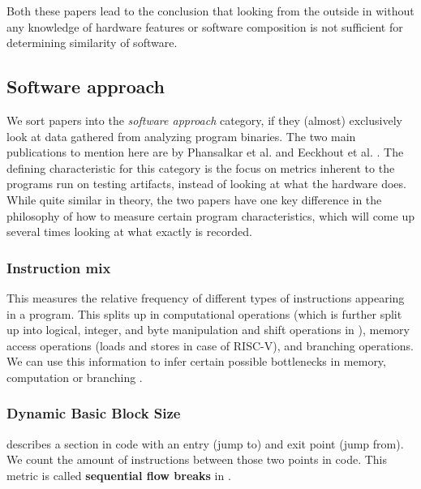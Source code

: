 \documentclass[../bachelor_paper.tex]{subfiles}
\begin{document}
Both these papers lead to the conclusion that looking from the outside in without any knowledge of hardware features or software composition is not sufficient for determining similarity of software.

\subsection{Software approach}
	\label{ch:theo/simi/soft}
We sort papers into the \emph{software approach} category, if they (almost) exclusively look at data gathered from analyzing program binaries. The two main publications to mention here are by Phansalkar et al. \cite{phansalkarMeasuringProgramSimilarity2005} and Eeckhout et al. \cite{eeckhoutDesigningComputerArchitecture2003}. The defining characteristic for this category is the focus on metrics inherent to the programs run on testing artifacts, instead of looking at what the hardware does. While quite similar in theory, the two papers have one key difference in the philosophy of how to measure certain program characteristics, which will come up several times looking at what exactly is recorded.

\subsubsection{Instruction mix} 
This measures the relative frequency of different types of instructions appearing in a program. This splits up in computational operations (which is further split up into logical, integer, and byte manipulation and shift operations in \cite{eeckhoutDesigningComputerArchitecture2003}), memory access operations (loads and stores in case of RISC-V), and branching operations. We can use this information to infer certain possible bottlenecks in memory, computation or branching \cite{phansalkarMeasuringProgramSimilarity2005}.

\subsubsection{Dynamic Basic Block Size} 
describes a section in code with an entry (jump to) and exit point (jump from). We count the amount of instructions between those two points in code. This metric is called \textbf{sequential flow breaks} in \cite{eeckhoutDesigningComputerArchitecture2003}.
\end{document}
